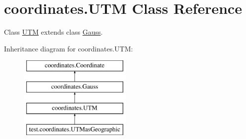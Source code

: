 \hypertarget{classcoordinates_1_1_u_t_m}{}\section{coordinates.\+U\+TM Class Reference}
\label{classcoordinates_1_1_u_t_m}


Class \hyperlink{classcoordinates_1_1_u_t_m}{U\+TM} extends class \hyperlink{classcoordinates_1_1_gauss}{Gauss}.  


Inheritance diagram for coordinates.\+U\+TM\+:\begin{figure}[H]
\begin{center}
\leavevmode
\includegraphics[height=4.000000cm]{classcoordinates_1_1_u_t_m}
\end{center}
\end{figure}
